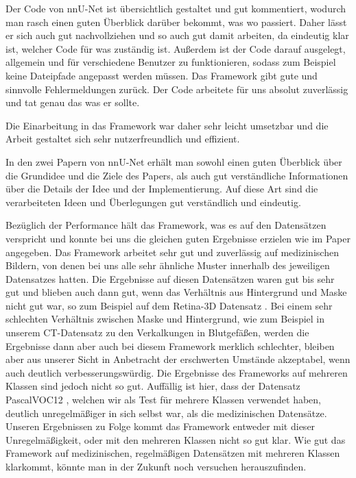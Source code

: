 Der Code von nnU-Net ist übersichtlich gestaltet und gut kommentiert, wodurch man rasch einen guten Überblick darüber bekommt, was wo passiert. Daher lässt er sich auch gut nachvollziehen und so auch gut damit arbeiten, da eindeutig klar ist, welcher Code für was zuständig ist. Außerdem ist der Code darauf ausgelegt, allgemein und für verschiedene Benutzer zu funktionieren, sodass zum Beispiel keine Dateipfade angepasst werden müssen.  
Das Framework gibt gute und sinnvolle Fehlermeldungen zurück. Der Code arbeitete für uns absolut zuverlässig und tat genau das was er sollte. 

Die Einarbeitung in das Framework war daher sehr leicht umsetzbar und die Arbeit gestaltet sich sehr nutzerfreundlich und effizient. 

In den zwei Papern von nnU-Net erhält man sowohl einen guten Überblick über die Grundidee und die Ziele des Papers, als auch gut verständliche Informationen über die Details der Idee und der Implementierung. Auf diese Art sind die verarbeiteten Ideen und Überlegungen gut verständlich und eindeutig. 

Bezüglich der Performance hält das Framework, was es auf den Datensätzen verspricht und konnte bei uns die gleichen guten Ergebnisse erzielen wie im Paper angegeben. Das Framework arbeitet sehr gut und zuverlässig auf medizinischen Bildern, von denen bei uns alle sehr ähnliche Muster innerhalb des jeweiligen Datensatzes hatten. Die Ergebnisse auf diesen Datensätzen waren gut bis sehr gut und blieben auch dann gut, wenn das Verhältnis aus Hintergrund und Maske nicht gut war, so zum Beispiel auf dem Retina-3D Datensatz \cite{retina3dDatensatz}. 
Bei einem sehr schlechten Verhältnis zwischen Maske und Hintergrund, wie zum Beispiel in unserem CT-Datensatz \cite{ctDatensatz} zu den Verkalkungen in Blutgefäßen, werden die Ergebnisse dann aber auch bei diesem Framework merklich schlechter, bleiben aber aus unserer Sicht in Anbetracht der erschwerten Umstände akzeptabel, wenn auch deutlich verbesserungswürdig. 
Die Ergebnisse des Frameworks auf mehreren Klassen sind jedoch nicht so gut. Auffällig ist hier, dass der Datensatz PascalVOC12 \cite{PascalVOCDatensatz}, welchen wir als Test für mehrere Klassen verwendet haben, deutlich unregelmäßiger in sich selbst war, als die medizinischen Datensätze. Unseren Ergebnissen zu Folge kommt das Framework entweder mit dieser Unregelmäßigkeit, oder mit den mehreren Klassen nicht so gut klar. Wie gut das Framework auf medizinischen, regelmäßigen Datensätzen mit mehreren Klassen klarkommt, könnte man in der Zukunft noch versuchen herauszufinden. 

